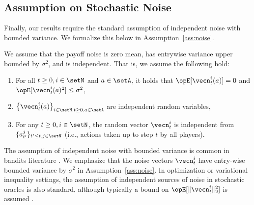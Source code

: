 \subsection{Assumption on Stochastic Noise}
Finally, our results require the standard assumption of independent noise with bounded variance. 
We formalize this below in Assumption~\ref{ass:noise}. 
\begin{assumption}
\label{ass:noise}
We assume that the payoff noise is zero mean, has entrywise variance upper bounded by $\sigma^2$, and is independent.
That is, we assume the following hold:
\begin{enumerate}
    \item For all $t \geq 0, i \in \setN$ and $a\in \setA$, it holds that $\Exop[ \vecn_t^i(a) ] = 0$ and $\Exop[ \vecn_t^i(a)^2 ] \leq \sigma^2$, 
    \item $\left\{\vecn_t^i(a)\right\}_{i\in  \setN, t \geq 0, a \in \setA}$ are independent random variables,
    \item For any $t \geq 0, i\in \setN$, the random vector $\vecn_t^i$ is independent from $\{a_{t'}^j\}_{t' \leq t, j \in \setN}$ (i.e., actions taken up to step $t$ by all players).
\end{enumerate}
\end{assumption}

The assumption of independent noise with bounded variance is common in bandits literature \citep{anandkumar2011distributed, avner2014concurrent, bubeck2021cooperative}.
We emphasize that the noise vectors $\vecn_t^i$ have entry-wise bounded variance by $\sigma^2$ in Assumption~\ref{ass:noise}.
In optimization or variational inequality settings, the assumption of independent sources of noise in stochastic oracles is also standard, although typically a bound on $\Exop[\| \vecn_t^i \|_2^2]$ is assumed \citep{  juditsky2011solving}.
